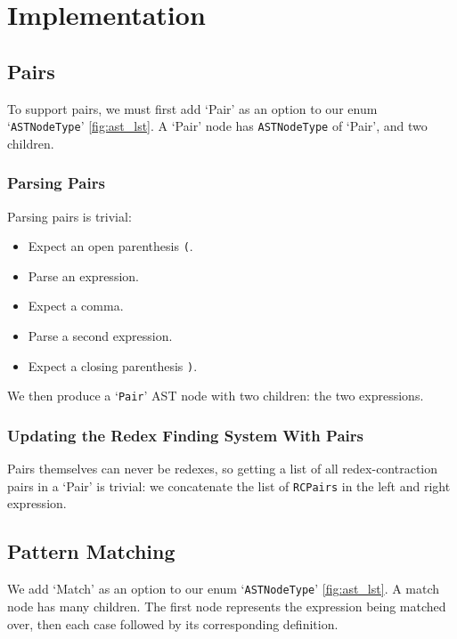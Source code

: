 \section{Implementation}

\subsection{Pairs}
To support pairs, we must first add `Pair' as an option to our enum `\verb|ASTNodeType|' \ref{fig:ast_lst}. A `Pair' node has \verb|ASTNodeType| of `Pair', and two children.

\subsubsection{Parsing Pairs}
Parsing pairs is trivial:
\begin{itemize}
    \item Expect an open parenthesis \verb|(|.
    \item Parse an expression.
    \item Expect a comma.
    \item Parse a second expression.
    \item Expect a closing parenthesis \verb|)|.
\end{itemize}
\noindent We then produce a `\verb|Pair|' \ac{AST} node with two children: the two expressions.
\subsubsection{Updating the Redex Finding System With Pairs}
Pairs themselves can never be redexes, so getting a list of all redex-contraction pairs in a `Pair' is trivial: we concatenate the list of \verb|RCPairs| in the left and right expression.

\subsection{Pattern Matching}
We add `Match' as an option to our enum `\verb|ASTNodeType|' \ref{fig:ast_lst}. A match node has many children. The first node represents the expression being matched over, then each case followed by its corresponding definition.
 
